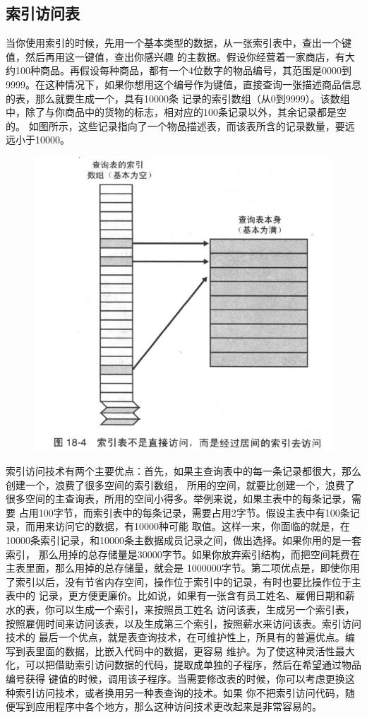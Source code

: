 \documentclass{article}
\begin{document}
\subsection{索引访问表}
当你使用索引的时候，先用一个基本类型的数据，从一张索引表中，查出一个键值，然后再用这一键值，查出你感兴趣
的主数据。假设你经营着一家商店，有大约100种商品。再假设每种商品，都有一个4位数字的物品编号，其范围是0000到
9999。在这种情况下，如果你想用这个编号作为键值，直接查询一张描述商品信息的表，那么就要生成一个，具有10000条
记录的索引数组（从0到9999）。该数组中，除了与你商品中的货物的标志，相对应的100条记录以外，其余记录都是空的。
如图所示，这些记录指向了一个物品描述表，而该表所含的记录数量，要远远小于10000。
\begin{figure}[htb]
    \centering
    \includegraphics[width=15cm]{figure19.png}
\end{figure}
索引访问技术有两个主要优点：首先，如果主查询表中的每一条记录都很大，那么创建一个，浪费了很多空间的索引数组，
所用的空间，就要比创建一个，浪费了很多空间的主查询表，所用的空间小得多。举例来说，如果主表中的每条记录，需要
占用100字节，而索引表中的每条记录，需要占用2字节。假设主表中有100条记录，而用来访问它的数据，有10000种可能
取值。这样一来，你面临的就是，在10000条索引记录，和10000条主数据成员记录之间，做出选择。如果你用的是一套索引，
那么用掉的总存储量是30000字节。如果你放弃索引结构，而把空间耗费在主表里面，那么用掉的总存储量，就会是
1000000字节。第二项优点是，即使你用了索引以后，没有节省内存空间，操作位于索引中的记录，有时也要比操作位于主表中的
记录，更方便更廉价。比如说，如果有一张含有员工姓名、雇佣日期和薪水的表，你可以生成一个索引，来按照员工姓名
访问该表，生成另一个索引表，按照雇佣时间来访问该表，以及生成第三个索引，按照薪水来访问该表。索引访问技术的
最后一个优点，就是表查询技术，在可维护性上，所具有的普遍优点。编写到表里面的数据，比嵌入代码中的数据，更容易
维护。为了使这种灵活性最大化，可以把借助索引访问数据的代码，提取成单独的子程序，然后在希望通过物品编号获得
键值的时候，调用该子程序。当需要修改表的时候，你可以考虑更换这种索引访问技术，或者换用另一种表查询的技术。如果
你不把索引访问代码，随便写到应用程序中各个地方，那么这种访问技术更改起来是非常容易的。
\end{document}
